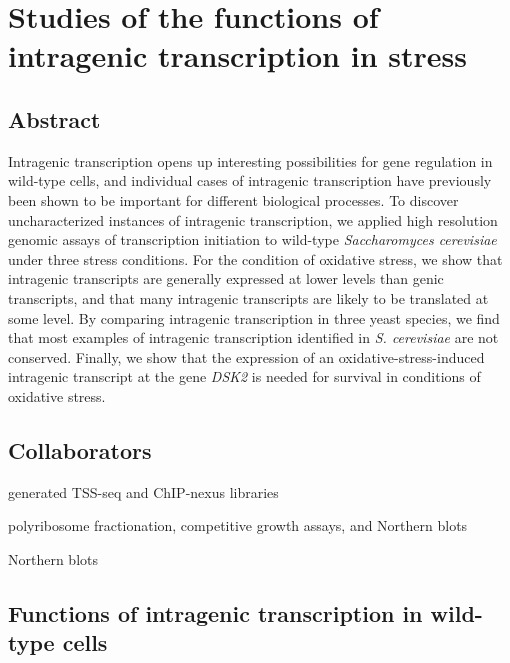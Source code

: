 \chapter{Studies of the functions of intragenic transcription in stress}
\label{chapter:stress}

\section{Abstract}

Intragenic transcription opens up interesting possibilities for gene regulation in wild-type cells, and individual cases of intragenic transcription have previously been shown to be important for different biological processes.
To discover uncharacterized instances of intragenic transcription, we applied high resolution genomic assays of transcription initiation to wild-type \textit{Saccharomyces cerevisiae} under three stress conditions.
For the condition of oxidative stress, we show that intragenic transcripts are generally expressed at lower levels than genic transcripts, and that many intragenic transcripts are likely to be translated at some level.
By comparing intragenic transcription in three yeast species, we find that most examples of intragenic transcription identified in \textit{S. cerevisiae} are not conserved.
Finally, we show that the expression of an oxidative-stress-induced intragenic transcript at the gene \textit{DSK2} is needed for survival in conditions of oxidative stress.

\clearpage

\section{Collaborators}

\begin{description}[align=right, labelwidth=5cm, noitemsep, leftmargin=!]
    \item [Steve Doris] generated TSS-seq and ChIP-nexus libraries
    \item [Dan Spatt] polyribosome fractionation, competitive growth assays, and Northern blots
    \item [James Warner] Northern blots
\end{description}

\section{Functions of intragenic transcription in wild-type cells}


